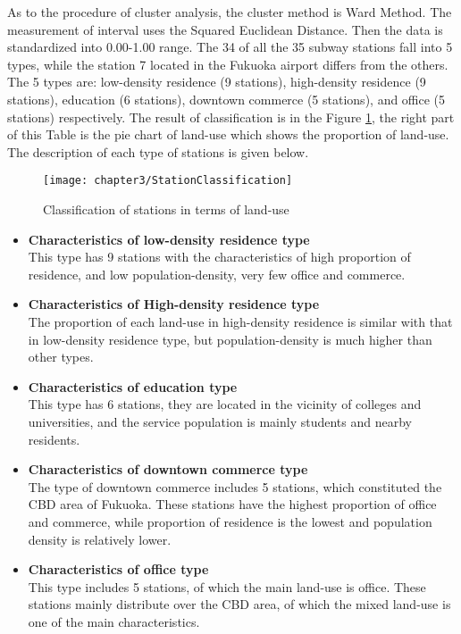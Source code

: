 %
As to the procedure of cluster analysis, the cluster method is Ward Method. The measurement of interval uses the Squared Euclidean Distance. Then the data is standardized into 0.00-1.00 range. The 34 of all the 35 subway stations fall into 5 types, while the station 7 located in the Fukuoka airport differs from the others. The 5 types are: low-density residence (9 stations), high-density residence (9 stations), education (6 stations), downtown commerce (5 stations), and office (5 stations) respectively. The result of classification is in the Figure \ref{fig:chp3:StationClassification}, the right part of this Table is the pie chart of land-use which shows the proportion of land-use. The description of each type of stations is given below. 

%
\begin{figure}[htbp]
	\centering
	\texttt{[image: chapter3/StationClassification]}
	\caption{Classification of stations in terms of land-use}
	\label{fig:chp3:StationClassification}
\end{figure}

%
\begin{itemize}
	\item \textbf{Characteristics of low-density residence type} \\
	This type has 9 stations with the characteristics of high proportion of residence, and low population-density, very few office and commerce.
	
	\item \textbf{Characteristics of High-density residence type} \\
	The proportion of each land-use in high-density residence is similar with that in low-density residence type, but population-density is much higher than other types.
	
	\item \textbf{Characteristics of education type} \\
	This type has 6 stations, they are located in the vicinity of colleges and universities, and the service population is mainly students and nearby residents.
	
	\item \textbf{Characteristics of downtown commerce type} \\
	The type of downtown commerce includes 5 stations, which constituted the CBD area of Fukuoka. These stations have the highest proportion of office and commerce, while proportion of residence is the lowest and population density is relatively lower.
	
	\item \textbf{Characteristics of office type} \\
	This type includes 5 stations, of which the main land-use is office. These stations mainly distribute over the CBD area, of which the mixed land-use is one of the main characteristics.
\end{itemize}

